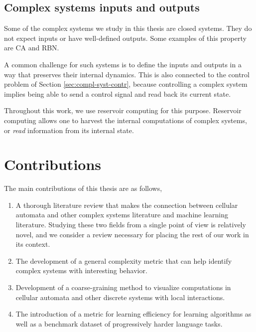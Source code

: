 \subsection{Complex systems inputs and outputs}

Some of the complex systems we study in this thesis are closed systems. They do
not expect inputs or have well-defined outputs. Some examples of this
property are \ac{CA} and \ac{RBN}.

A common challenge for such
systems is to define the inputs and outputs in a way that preserves their internal
dynamics. This is also connected to the control problem of Section
\ref{sec:compl-syst-contr}, because controlling a complex system implies being
able to send a control signal and read back its current state.

Throughout this work, we use reservoir computing for this purpose.
Reservoir computing allows one to harvest the internal computations of complex
systems, or \emph{read} information from its internal state.


\section{Contributions}

The main contributions of this thesis are as follows,
\begin{enumerate}
  \item A thorough literature review that makes the connection between cellular
        automata and other complex systems literature and machine learning
        literature. Studying these two fields from a single point of view is
        relatively novel, and we consider a review necessary for placing the
        rest of our work in its context.

  \item The development of a general complexity metric that can help identify
        complex systems with interesting behavior.

  \item Development of a coarse-graining method to visualize computations
        in cellular automata and other discrete systems with local interactions.

  \item The introduction of a metric for learning efficiency for learning
        algorithms as well as a benchmark dataset of progressively harder
        language tasks.
\end{enumerate}

